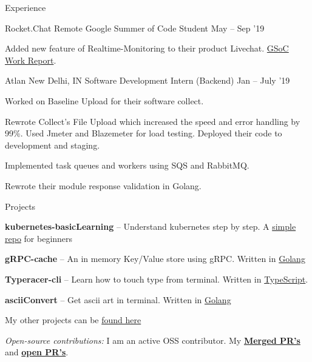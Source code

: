 \documentclass{resume} %
\begin{document}
\begin{rSection}{Experience}
  \begin{rWorkSection}{Rocket.Chat}
                      {Remote}
                      {Google Summer of Code Student}
                      {May -- Sep '19}
  {
    \item Added new feature of Realtime-Monitoring to their product Livechat. \href{http://bit.ly/2kGqWt2}{GSoC Work Report}.
  }
  \end{rWorkSection}

  \begin{rWorkSection}{Atlan}
                     {New Delhi, IN}
                     {Software Development Intern (Backend)}
                     {Jan -- July '19}
  {
    \item Worked on Baseline Upload for their software collect. 
    \item Rewrote Collect's File Upload which increased the speed and error handling by 99\%. Used Jmeter and Blazemeter for load testing. Deployed their code to development and staging.
    \item Implemented task queues and workers using SQS and RabbitMQ.
    \item Rewrote their module response validation in Golang.
  }
  \end{rWorkSection}
\end{rSection}


\begin{rSection}{Projects}
  \begin{rProjectSection}
    \item \textbf {kubernetes-basicLearning} -- Understand kubernetes step by step. A \href{https://github.com/knrt10/kubernetes-basicLearning/}{simple repo} for beginners
    \item \textbf {gRPC-cache} -- An in memory Key/Value store using gRPC. Written in \href{https://github.com/knrt10/gRPC-cache}{Golang}
    \item \textbf {Typeracer-cli} -- Learn how to touch type from terminal. Written in \href{https://github.com/p-society/typeracer-cli/}{TypeScript}.
    \item \textbf {asciiConvert} -- Get ascii art in terminal. Written in \href{https://github.com/knrt10/asciiConvert/}{Golang}
    \item My other projects can be \href{https://knrt10.github.io/projects/}{found here}
  \end{rProjectSection}

  \begin{rBlurbSection}
    \item {\em Open-source contributions:}
      I am an active OSS contributor. My \href{http://bit.ly/2kdr9Ui}{\textbf{Merged PR's}} and \href{http://bit.ly/2kxjvV9}{\textbf{open PR's}}.
  \end{rBlurbSection}
\end{rSection}
\end{document}
